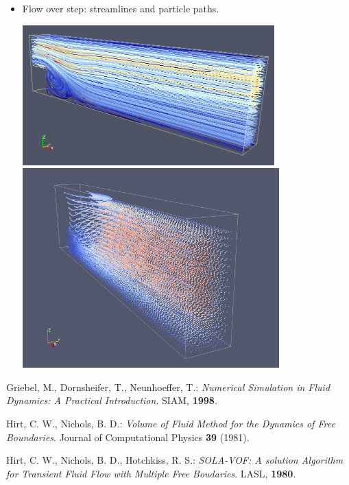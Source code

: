 \documentclass[a4paper, 12pt]{article}
\begin{document}
\begin{itemize}
\newpage
\item Flow over step: streamlines and particle paths.\\
\begin{center}
\includegraphics[height=5.4cm]{flowoverstep.png}\\
\includegraphics[height=7.7cm]{Step-Particles.png}
\end{center}
\end{itemize}

\begin{thebibliography}{99}
Griebel, M., Dornsheifer, T., Neunhoeffer, T.: \emph{Numerical Simulation in
Fluid Dynamics: A Practical Introduction}. SIAM, {\bf 1998}.

Hirt, C. W., Nichols, B. D.: \emph{Volume of Fluid Method for the Dynamics of Free Boundaries}. Journal of Computational Physics {\bf 39} (1981).

Hirt, C. W., Nichols, B. D., Hotchkiss, R. S.: \emph{SOLA-VOF: A solution Algorithm for Transient Fluid Flow with Multiple Free Boudaries}. LASL, {\bf 1980}.
\end{thebibliography}
\end{document}
